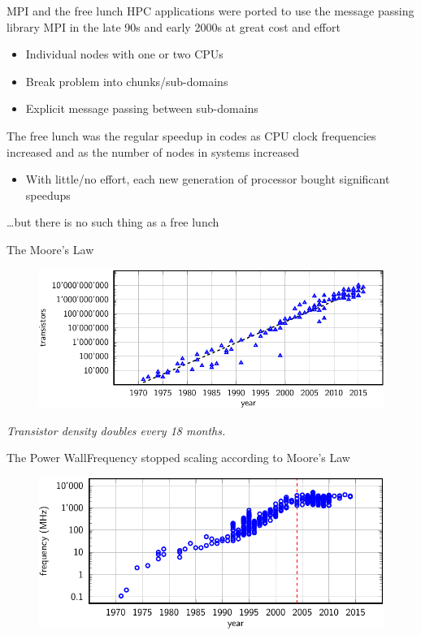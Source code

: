 \documentclass[aspectratio=169,12pt]{beamer}
\begin{document}
\begin{frame}{MPI and the free lunch}
  HPC applications were ported to use the message passing library MPI in the late 90s and early 2000s at great cost and effort
  \begin{itemize}
  \item Individual nodes with one or two CPUs
  \item Break problem into chunks/sub-domains
  \item Explicit message passing between sub-domains
  \end{itemize}

  The free lunch was the regular speedup in codes as CPU clock frequencies increased and as the number of nodes in systems increased
  \begin{itemize}
  \item With little/no effort, each new generation of processor bought significant speedups
  \end{itemize}
  \dots but there is no such thing as a free lunch
\end{frame}

\begin{frame}{The Moore's Law}
  \begin{figure}
    \centering
    \includegraphics[width=.8\textwidth]{transistors_growth}
  \end{figure}
  \small
  \vspace{-.5\baselineskip}\centering
  \emph{Transistor density doubles every 18 months.}
\end{frame}

\begin{frame}{The Power Wall}{Frequency stopped scaling according to Moore's Law}
  \begin{figure}
    \centering
    \includegraphics[width=.8\textwidth]{freq_scaling}
  \end{figure}
  \vspace{-.5\baselineskip}\centering
\end{frame}
\end{document}
